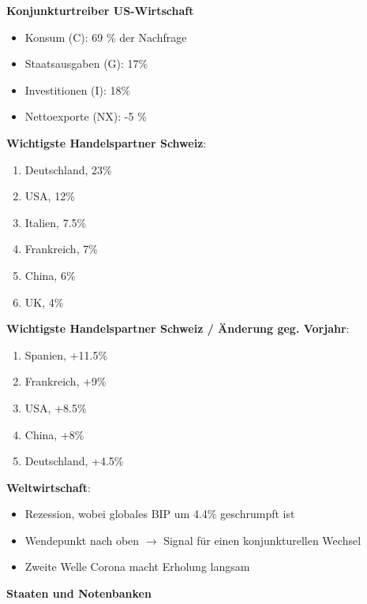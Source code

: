 \documentclass[9pt, landscape, fleqn]{scrartcl}
\begin{document}
\begin{multicols*}{3}
\textbf{Konjunkturtreiber US-Wirtschaft}

\begin{itemize}
    \item Konsum (C): 69 \% der Nachfrage
    \item Staatsausgaben (G): 17\%
    \item Investitionen (I): 18\% 
    \item Nettoexporte (NX): -5 \%
\end{itemize}

\textbf{Wichtigste Handelspartner Schweiz}:

\begin{enumerate}
    \item Deutschland, 23\%
    \item USA, 12\% 
    \item Italien, 7.5\% 
    \item Frankreich, 7\% 
    \item China, 6\%
    \item UK, 4\%
\end{enumerate}

\textbf{Wichtigste Handelspartner Schweiz / Änderung geg. Vorjahr}:

\begin{enumerate}
    \item Spanien, +11.5\%
    \item Frankreich, +9\% 
    \item USA, +8.5\%
    \item China, +8\%
    \item Deutschland, +4.5\% 
\end{enumerate}

\textbf{Weltwirtschaft}:

\begin{itemize}
    \item Rezession, wobei globales BIP um 4.4\% geschrumpft ist 
    \item Wendepunkt nach oben $\rightarrow$ Signal für einen konjunkturellen Wechsel 
    \item Zweite Welle Corona macht Erholung langsam
\end{itemize}

\textbf{Staaten und Notenbanken}

\end{multicols*}
\end{document}
